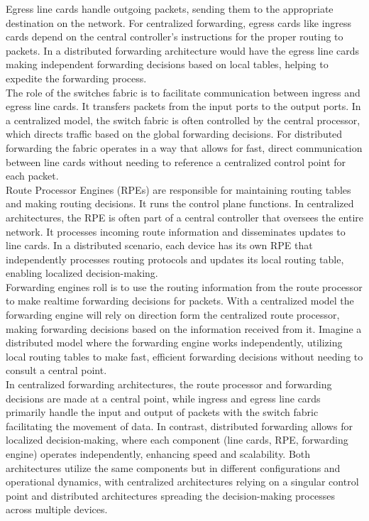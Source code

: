 \documentclass{article}
\begin{document}
	Egress line cards handle outgoing packets, sending them to the appropriate destination on the network. For centralized forwarding, egress cards like ingress cards depend on the central controller's instructions for the proper routing to packets. In a distributed forwarding architecture would have the egress line cards making independent forwarding decisions based on local tables, helping to expedite the forwarding process.\\

	The role of the switches fabric is to facilitate communication between ingress and egress line cards. It transfers packets from the input ports to the output ports. In a centralized model, the switch fabric is often controlled by the central processor, which directs traffic based on the global forwarding decisions. For distributed forwarding the fabric operates in a way that allows for fast, direct communication between line cards without needing to reference a centralized control point for each packet.\\

	Route Processor Engines (RPEs) are responsible for maintaining routing tables and making routing decisions. It runs the control plane functions. In centralized architectures, the RPE is often part of a central controller that oversees the entire network. It processes incoming route information and disseminates updates to line cards. In a distributed scenario, each device has its own RPE that independently processes routing protocols and updates its local routing table, enabling localized decision-making.\\

	Forwarding engines roll is to use the routing information from the route processor to make realtime forwarding decisions for packets. With a centralized model the forwarding engine will rely on direction form the centralized route processor, making forwarding decisions based on the information received from it. Imagine a distributed model where the forwarding engine works independently, utilizing local routing tables to make fast, efficient forwarding decisions without needing to consult a central point.\\

	In centralized forwarding architectures, the route processor and forwarding decisions are made at a central point, while ingress and egress line cards primarily handle the input and output of packets with the switch fabric facilitating the movement of data. In contrast, distributed forwarding allows for localized decision-making, where each component (line cards, RPE, forwarding engine) operates independently, enhancing speed and scalability. Both architectures utilize the same components but in different configurations and operational dynamics, with centralized architectures relying on a singular control point and distributed architectures spreading the decision-making processes across multiple devices.\\
\end{document}
